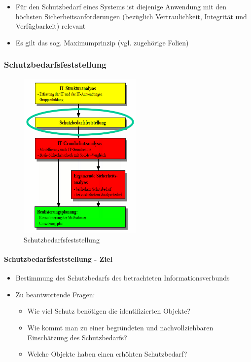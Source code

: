 \documentclass[10pt,a4paper]{article}
\begin{document}
\begin{itemize}[noitemsep,topsep=0pt,leftmargin=*]
    \item Für den Schutzbedarf eines Systems ist diejenige
    Anwendung mit den höchsten
    Sicherheitsanforderungen (bezüglich Vertraulichkeit,
    Integrität und Verfügbarkeit) relevant
    \item Es gilt das sog. Maximumprinzip (vgl. zugehörige
    Folien)
\end{itemize}

\subsubsection*{Schutzbedarfsfeststellung}
\begin{figure}[H]
    \begin{center}
    \includegraphics[width=6cm]{images/Schutzbedarfsfeststellung.png}
    \caption{Schutzbedarfsfeststellung}
    \label{Schutzbedarfsfeststellung}
    \end{center}
\end{figure}

\paragraph*{Schutzbedarfsfeststellung - Ziel}
\begin{itemize}[noitemsep,topsep=0pt,leftmargin=*]
    \item Bestimmung des Schutzbedarfs des
    betrachteten Informationsverbunds
    \item Zu beantwortende Fragen:
    \begin{itemize}[noitemsep,topsep=0pt,leftmargin=*]
        \item Wie viel Schutz benötigen die identifizierten
        Objekte?
        \item Wie kommt man zu einer begründeten und
        nachvollziehbaren Einschätzung des
        Schutzbedarfs?
        \item Welche Objekte haben einen erhöhten
        Schutzbedarf?
    \end{itemize}
\end{itemize}
\end{document}
